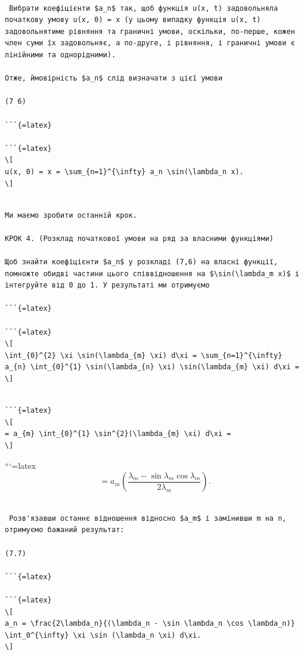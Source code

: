 \documentclass[
]{article}
\begin{document}
\begin{verbatim}

 Вибрати коефіцієнти $a_n$ так, щоб функція u(x, t) задовольняла початкову умову u(x, 0) = x (у цьому випадку функція u(x, t) задовольнятиме рівняння та граничні умови, оскільки, по-перше, кожен член суми їх задовольняє, а по-друге, і рівняння, і граничні умови є лінійними та однорідними).

Отже, ймовірність $a_n$ слід визначати з цієї умови

(7 6)

```{=latex}

```{=latex}
\[
u(x, 0) = x = \sum_{n=1}^{\infty} a_n \sin(\lambda_n x).
\]
\end{verbatim}

\begin{verbatim}

Ми маємо зробити останній крок.

КРОК 4. (Розклад початкової умови на ряд за власними функціями)

Щоб знайти коефіцієнти $a_n$ у розкладі (7,6) на власні функції, помножте обидві частини цього співвідношення на $\sin(\lambda_m x)$ і інтегруйте від 0 до 1. У результаті ми отримуємо

```{=latex}

```{=latex}
\[
\int_{0}^{2} \xi \sin(\lambda_{m} \xi) d\xi = \sum_{n=1}^{\infty} a_{n} \int_{0}^{1} \sin(\lambda_{n} \xi) \sin(\lambda_{m} \xi) d\xi =
\]
\end{verbatim}

\begin{verbatim}

```{=latex}
\[
= a_{m} \int_{0}^{1} \sin^{2}(\lambda_{m} \xi) d\xi =
\]
\end{verbatim}

```{=latex}
\[
= a_{m} \left( \frac{\lambda_{m} - \sin \lambda_{m} \cos \lambda_{m}}{2\lambda_{m}} \right).
\]

\begin{verbatim}

 Розв'язавши останнє відношення відносно $a_m$ і замінивши m на n, отримуємо бажаний результат:

(7.7)

```{=latex}

```{=latex}
\[
a_n = \frac{2\lambda_n}{(\lambda_n - \sin \lambda_n \cos \lambda_n)} \int_0^{\infty} \xi \sin (\lambda_n \xi) d\xi.
\]
\end{verbatim}
\end{document}
